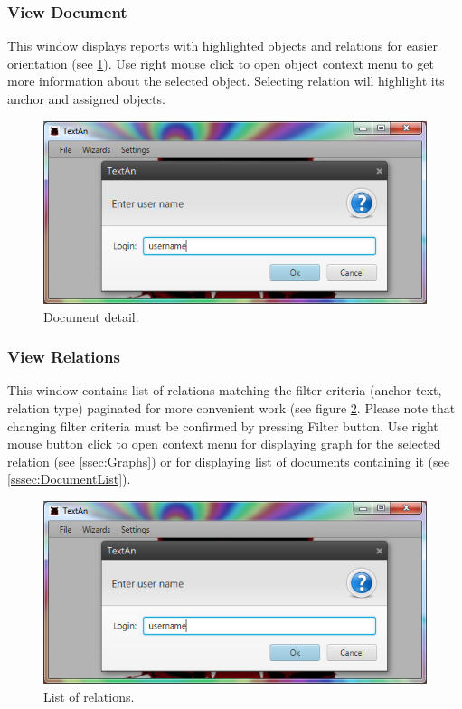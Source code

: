 \documentclass[12pt,a4paper]{report}
\begin{document}
\subsubsection{View Document}
\label{sssec:DocumentView}

This window displays reports with highlighted objects and relations for easier
orientation (see \ref{fig:DocumentView}). Use right mouse click to open object
context menu to get more information about the selected object. Selecting
relation will highlight its anchor and assigned objects.

\begin{figure}[!htb]
        \centering
        \includegraphics[width=\textwidth]{Images/documentview}
        \caption{Document detail.}
        \label{fig:DocumentView}
\end{figure}

\subsubsection{View Relations}

This window contains list of relations matching the filter criteria (anchor
text, relation type) paginated for more convenient work (see figure
\ref{fig:RelationList}. Please note that changing filter criteria must be
confirmed by pressing Filter button. Use right mouse button click to open
context menu for displaying graph for the selected relation (see \ref{ssec:Graphs})
or for displaying list of documents containing it (see \ref{sssec:DocumentList}).

\begin{figure}[!htb]
        \centering
        \includegraphics[width=\textwidth]{Images/relationlist}
        \caption{List of relations.}
        \label{fig:RelationList}
\end{figure}
\end{document}
